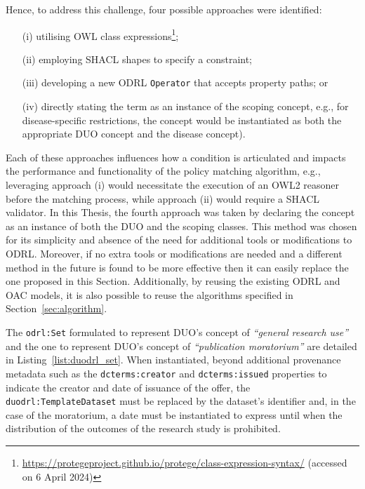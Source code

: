 Hence, to address this challenge, four possible approaches were identified:
\begin{enumerate}
    \item [(i)] utilising OWL class expressions\footnote{\url{https://protegeproject.github.io/protege/class-expression-syntax/} (accessed on 6 April 2024)};
    \item [(ii)] employing SHACL shapes to specify a constraint;
    \item [(iii)] developing a new ODRL \texttt{Operator} that accepts property paths; or
    \item [(iv)] directly stating the term as an instance of the scoping concept, e.g., for disease-specific restrictions, the concept would be instantiated as both the appropriate DUO concept and the disease concept).
\end{enumerate}
Each of these approaches influences how a condition is articulated and impacts the performance and functionality of the policy matching algorithm, e.g., leveraging approach (i) would necessitate the execution of an OWL2 reasoner before the matching process, while approach (ii) would require a SHACL validator.
In this Thesis, the fourth approach was taken by declaring the concept as an instance of both the DUO and the scoping classes.
This method was chosen for its simplicity and absence of the need for additional tools or modifications to ODRL.
Moreover, if no extra tools or modifications are needed and a different method in the future is found to be more effective then it can easily replace the one proposed in this Section.
Additionally, by reusing the existing ODRL and OAC models, it is also possible to reuse the algorithms specified in Section~\ref{sec:algorithm}.

The \texttt{odrl:Set} formulated to represent DUO's concept of \textit{``general research use''} and the one to represent DUO's concept of \textit{``publication moratorium''} are detailed in Listing~\ref{list:duodrl_set}.
When instantiated, beyond additional provenance metadata such as the \texttt{dcterms:creator} and \texttt{dcterms:issued} properties to indicate the creator and date of issuance of the offer, the \texttt{duodrl:TemplateDataset} must be replaced by the dataset's identifier and, in the case of the moratorium, a date must be instantiated to express until when the distribution of the outcomes of the research study is prohibited. 

